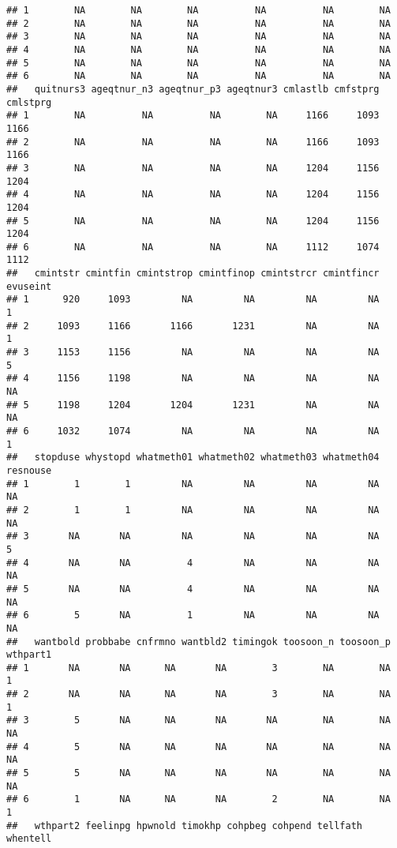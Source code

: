 \documentclass[]{article}
\begin{document}
\begin{verbatim}
## 1        NA        NA        NA          NA          NA        NA
## 2        NA        NA        NA          NA          NA        NA
## 3        NA        NA        NA          NA          NA        NA
## 4        NA        NA        NA          NA          NA        NA
## 5        NA        NA        NA          NA          NA        NA
## 6        NA        NA        NA          NA          NA        NA
##   quitnurs3 ageqtnur_n3 ageqtnur_p3 ageqtnur3 cmlastlb cmfstprg cmlstprg
## 1        NA          NA          NA        NA     1166     1093     1166
## 2        NA          NA          NA        NA     1166     1093     1166
## 3        NA          NA          NA        NA     1204     1156     1204
## 4        NA          NA          NA        NA     1204     1156     1204
## 5        NA          NA          NA        NA     1204     1156     1204
## 6        NA          NA          NA        NA     1112     1074     1112
##   cmintstr cmintfin cmintstrop cmintfinop cmintstrcr cmintfincr evuseint
## 1      920     1093         NA         NA         NA         NA        1
## 2     1093     1166       1166       1231         NA         NA        1
## 3     1153     1156         NA         NA         NA         NA        5
## 4     1156     1198         NA         NA         NA         NA       NA
## 5     1198     1204       1204       1231         NA         NA       NA
## 6     1032     1074         NA         NA         NA         NA        1
##   stopduse whystopd whatmeth01 whatmeth02 whatmeth03 whatmeth04 resnouse
## 1        1        1         NA         NA         NA         NA       NA
## 2        1        1         NA         NA         NA         NA       NA
## 3       NA       NA         NA         NA         NA         NA        5
## 4       NA       NA          4         NA         NA         NA       NA
## 5       NA       NA          4         NA         NA         NA       NA
## 6        5       NA          1         NA         NA         NA       NA
##   wantbold probbabe cnfrmno wantbld2 timingok toosoon_n toosoon_p wthpart1
## 1       NA       NA      NA       NA        3        NA        NA        1
## 2       NA       NA      NA       NA        3        NA        NA        1
## 3        5       NA      NA       NA       NA        NA        NA       NA
## 4        5       NA      NA       NA       NA        NA        NA       NA
## 5        5       NA      NA       NA       NA        NA        NA       NA
## 6        1       NA      NA       NA        2        NA        NA        1
##   wthpart2 feelinpg hpwnold timokhp cohpbeg cohpend tellfath whentell

\end{verbatim}
\end{document}
